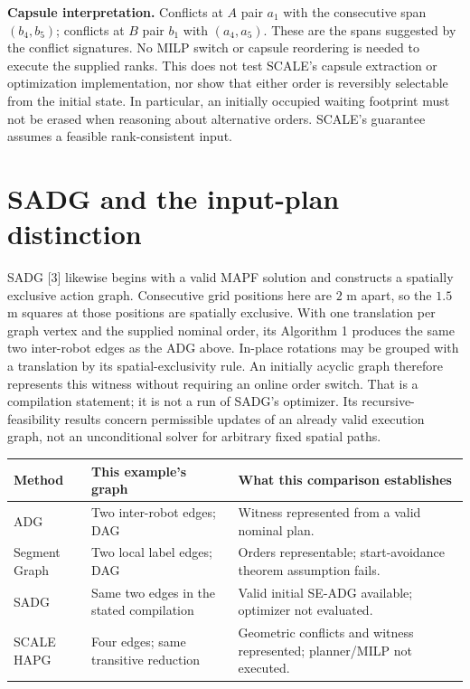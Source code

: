 \documentclass[11pt,a4paper]{article}
\begin{document}
\textbf{Capsule interpretation.} Conflicts at $A$ pair $a_1$ with the consecutive
span $(b_4,b_5)$; conflicts at $B$ pair $b_1$ with $(a_4,a_5)$.
These are the spans suggested by the conflict signatures. No MILP switch or
capsule reordering is needed to execute the supplied ranks. This does not test
SCALE's capsule extraction or optimization implementation, nor show that either
order is reversibly selectable from the initial state. In particular, an
initially occupied waiting footprint must not be erased when reasoning about
alternative orders. SCALE's guarantee assumes a feasible rank-consistent input.

\section{SADG and the input-plan distinction}
SADG [3] likewise begins with a valid MAPF solution and constructs a spatially
exclusive action graph. Consecutive grid positions here are $2$ m apart, so the
$1.5$ m squares at those positions are spatially exclusive. With one translation
per graph vertex and the supplied nominal order, its Algorithm 1 produces the
same two inter-robot edges as the ADG above. In-place rotations may be grouped
with a translation by its spatial-exclusivity rule.
An initially acyclic graph therefore represents this witness without requiring
an online order switch. That is a compilation statement; it is not a run of
SADG's optimizer. Its recursive-feasibility results concern permissible updates
of an already valid execution graph, not an unconditional solver for arbitrary
fixed spatial paths.

\begin{center}\small
\begin{tabular}{p{23mm}p{44mm}p{76mm}}
\toprule
Method & This example's graph & What this comparison establishes\\
\midrule
ADG & Two inter-robot edges; DAG & Witness represented from a valid nominal plan.\\
Segment Graph & Two local label edges; DAG & Orders representable; start-avoidance theorem assumption fails.\\
SADG & Same two edges in the stated compilation & Valid initial SE-ADG available; optimizer not evaluated.\\
SCALE HAPG & Four edges; same transitive reduction & Geometric conflicts and witness represented; planner/MILP not executed.\\
\bottomrule
\end{tabular}
\end{center}
\end{document}
